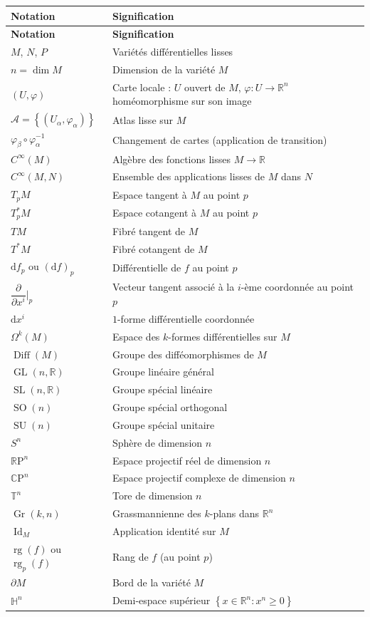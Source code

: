\documentclass[12pt,a4paper,openany]{book}
\theoremstyle{definition}
\theoremstyle{plain}
\theoremstyle{remark}
\newcommand{\R}{\mathbb{R}}
\newcommand{\RP}{\mathbb{R}\mathrm{P}}
\newcommand{\CP}{\mathbb{C}\mathrm{P}}
\DeclareMathOperator{\Id}{Id}
\DeclareMathOperator{\rg}{rg}
\DeclareMathOperator{\GL}{GL}
\DeclareMathOperator{\SL}{SL}
\DeclareMathOperator{\SO}{SO}
\DeclareMathOperator{\SU}{SU}
\DeclareMathOperator{\Diff}{Diff}
\newcommand{\dd}{\mathrm{d}}
\newcommand{\set}[1]{\left\{#1\right\}}
\begin{document}
\begin{longtable}{>{\raggedright}p{3.5cm} p{10cm}}
\toprule
\textbf{Notation} & \textbf{Signification} \\
\midrule
\endfirsthead
\toprule
\textbf{Notation} & \textbf{Signification} \\
\midrule
\endhead
\bottomrule
\endfoot
$M$, $N$, $P$ & Variétés différentielles lisses \\
$n = \dim M$ & Dimension de la variété $M$ \\
$(U, \varphi)$ & Carte locale : $U$ ouvert de $M$, $\varphi \colon U \to \R^n$ homéomorphisme sur son image \\
$\mathcal{A} = \set{(U_\alpha, \varphi_\alpha)}$ & Atlas lisse sur $M$ \\
$\varphi_\beta \circ \varphi_\alpha^{-1}$ & Changement de cartes (application de transition) \\
$C^\infty(M)$ & Algèbre des fonctions lisses $M \to \R$ \\
$C^\infty(M, N)$ & Ensemble des applications lisses de $M$ dans $N$ \\
$T_pM$ & Espace tangent à $M$ au point $p$ \\
$T_p^*M$ & Espace cotangent à $M$ au point $p$ \\
$TM$ & Fibré tangent de $M$ \\
$T^*M$ & Fibré cotangent de $M$ \\
$\dd f_p$ ou $(\dd f)_p$ & Différentielle de $f$ au point $p$ \\
$\dfrac{\partial}{\partial x^i}\Big|_p$ & Vecteur tangent associé à la $i$-ème coordonnée au point $p$ \\
$\dd x^i$ & $1$-forme différentielle coordonnée \\
$\Omega^k(M)$ & Espace des $k$-formes différentielles sur $M$ \\
$\Diff(M)$ & Groupe des difféomorphismes de $M$ \\
$\GL(n, \R)$ & Groupe linéaire général \\
$\SL(n, \R)$ & Groupe spécial linéaire \\
$\SO(n)$ & Groupe spécial orthogonal \\
$\SU(n)$ & Groupe spécial unitaire \\
$S^n$ & Sphère de dimension $n$ \\
$\RP^n$ & Espace projectif réel de dimension $n$ \\
$\CP^n$ & Espace projectif complexe de dimension $n$ \\
$\mathbb{T}^n$ & Tore de dimension $n$ \\
$\operatorname{Gr}(k,n)$ & Grassmannienne des $k$-plans dans $\R^n$ \\
$\Id_M$ & Application identité sur $M$ \\
$\rg(f)$ ou $\rg_p(f)$ & Rang de $f$ (au point $p$) \\
$\partial M$ & Bord de la variété $M$ \\
$\mathbb{H}^n$ & Demi-espace supérieur $\set{x \in \R^n : x^n \geq 0}$ \\
\end{longtable}
\end{document}
